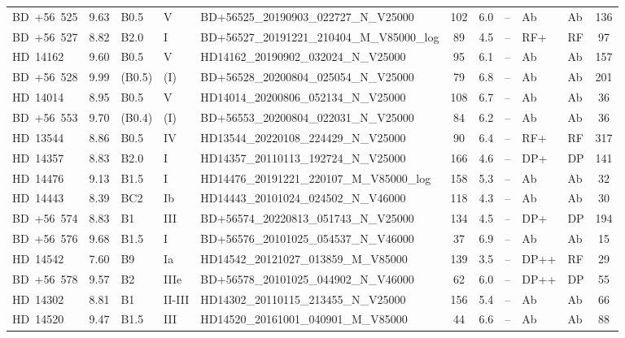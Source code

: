 {\begin{landscape}
\begin{longtable}{lclllcclllc}
\noalign{\smallskip}
BD~+56~525 & 9.63 & B0.5 & V & BD+56525\_20190903\_022727\_N\_V25000 & 102 & 6.0 & -- & Ab & Ab & 136 \\
\noalign{\smallskip}
BD~+56~527 & 8.82 & B2.0 & I & BD+56527\_20191221\_210404\_M\_V85000\_log & 89 & 4.5 & -- & RF+ & RF & 97 \\
\noalign{\smallskip}
HD~14162 & 9.60 & B0.5 & V & HD14162\_20190902\_032024\_N\_V25000 & 95 & 6.1 & -- & Ab & Ab & 157 \\
\noalign{\smallskip}
BD~+56~528 & 9.99 & (B0.5) & (I) & BD+56528\_20200804\_025054\_N\_V25000 & 79 & 6.8 & -- & Ab & Ab & 201 \\
\noalign{\smallskip}
HD~14014 & 8.95 & B0.5 & V & HD14014\_20200806\_052134\_N\_V25000 & 108 & 6.7 & -- & Ab & Ab & 36 \\
\noalign{\smallskip}
BD~+56~553 & 9.70 & (B0.4) & (I) & BD+56553\_20200804\_022031\_N\_V25000 & 84 & 6.2 & -- & Ab & Ab & 36 \\
\noalign{\smallskip}
HD~13544 & 8.86 & B0.5 & IV & HD13544\_20220108\_224429\_N\_V25000 & 90 & 6.4 & -- & RF+ & RF & 317 \\
\noalign{\smallskip}
HD~14357 & 8.83 & B2.0 & I & HD14357\_20110113\_192724\_N\_V25000 & 166 & 4.6 & -- & DP+ & DP & 141 \\
\noalign{\smallskip}
HD~14476 & 9.13 & B1.5 & I & HD14476\_20191221\_220107\_M\_V85000\_log & 158 & 5.3 & -- & Ab & Ab & 32 \\
\noalign{\smallskip}
HD~14443 & 8.39 & BC2 & Ib & HD14443\_20101024\_024502\_N\_V46000 & 118 & 4.3 & -- & Ab & Ab & 30 \\
\noalign{\smallskip}
BD~+56~574 & 8.83 & B1 & III & BD+56574\_20220813\_051743\_N\_V25000 & 134 & 4.5 & -- & DP+ & DP & 194 \\
\noalign{\smallskip}
BD~+56~576 & 9.68 & B1.5 & I & BD+56576\_20101025\_054537\_N\_V46000 & 37 & 6.9 & -- & Ab & Ab & 15 \\
\noalign{\smallskip}
HD~14542 & 7.60 & B9 & Ia & HD14542\_20121027\_013859\_M\_V85000 & 139 & 3.5 & -- & DP++ & RF & 29 \\
\noalign{\smallskip}
BD~+56~578 & 9.57 & B2 & IIIe & BD+56578\_20101025\_044902\_N\_V46000 & 62 & 6.0 & -- & DP++ & DP & 55 \\
\noalign{\smallskip}
HD~14302 & 8.81 & B1 & II-III & HD14302\_20110115\_213455\_N\_V25000 & 156 & 5.4 & -- & Ab & Ab & 66 \\
\noalign{\smallskip}
HD~14520 & 9.47 & B1.5 & III & HD14520\_20161001\_040901\_M\_V85000 & 44 & 6.6 & -- & Ab & Ab & 88 \\

\end{longtable}
\end{landscape}}
